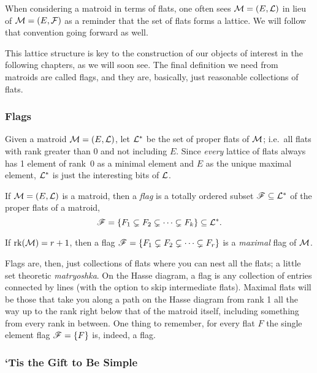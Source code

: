 \documentclass[12pt,oneside]{../../sfsuthesis}
\begin{document}
When considering a matroid in terms of flats, one often sees \( \mathcal{M} = (E, \mathcal{L}) \) in lieu of \( \mathcal{M} = (E, \mathcal{F}) \) as a reminder that the set of flats forms a lattice.
We will follow that convention going forward as well.

This lattice structure is key to the construction of our objects of interest in the following chapters, as we will soon see.
The final definition we need from matroids are called flags, and they are, basically, just reasonable collections of flats.

\subsubsection{Flags}

Given a matroid \( \mathcal{M} = (E, \mathcal{L}) \), let \( \mathcal{L}^\ast \) be the set of proper flats of \( \mathcal{M} \);
i.e.\ all flats with rank greater than 0 and not including \( E \).
Since \textit{every} lattice of flats always has 1 element of rank~0 as a minimal element and \( E \) as the unique maximal element, \( \mathcal{L}^\ast \) is just the interesting bits of \( \mathcal{L} \).

\begin{definition}[Flag]\label{def:flag}

    If \( \mathcal{M} = (E, \mathcal{L}) \) is a matroid, then a \emph{flag} is a totally ordered subset \( \mathscr{F} \subseteq \mathcal{L}^\ast \) of the proper flats of a matroid,
    \[
        \mathscr{F} = \{ F_1 \subsetneq F_2 \subsetneq \cdots \subsetneq F_k \} \subseteq \mathcal{L}^\ast.
    \]

    If \( \operatorname{rk}(\mathcal{M}) = r + 1 \), then a flag \( \mathscr{F} = \{ F_1 \subsetneq F_2 \subsetneq \cdots \subsetneq F_r \} \) is a \emph{maximal} flag of \( \mathcal{M} \).

\end{definition}

Flags are, then, just collections of flats where you can nest all the flats; a little set theoretic \textit{matryoshka}.
On the Hasse diagram, a flag is any collection of entries connected by lines (with the option to skip intermediate flats).
Maximal flats will be those that take you along a path on the Hasse diagram from rank 1 all the way up to the rank right below that of the matroid itself, including something from every rank in between.
One thing to remember, for every flat \( F \) the single element flag \( \mathscr{F} = \{ F \} \) is, indeed, a flag.


\subsubsection{`Tis the Gift to Be Simple}
\end{document}
